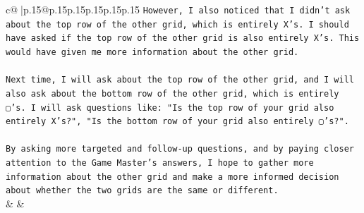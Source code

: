 \documentclass{article}
\begin{document}
{\begin{supertabular}{c@{$\;$}|p{.15\linewidth}@{}p{.15\linewidth}p{.15\linewidth}p{.15\linewidth}p{.15\linewidth}p{.15\linewidth}}
{{{\texttt{However, I also noticed that I didn't ask about the top row of the other grid, which is entirely X's. I should have asked if the top row of the other grid is also entirely X's. This would have given me more information about the other grid.} \\
\\ 
\texttt{Next time, I will ask about the top row of the other grid, and I will also ask about the bottom row of the other grid, which is entirely ▢'s. I will ask questions like: "Is the top row of your grid also entirely X's?", "Is the bottom row of your grid also entirely ▢'s?".} \\
\\ 
\texttt{By asking more targeted and follow{-}up questions, and by paying closer attention to the Game Master's answers, I hope to gather more information about the other grid and make a more informed decision about whether the two grids are the same or different.} \\
            }
        }
    }
    & & \\ \\


\end{supertabular}}
\end{document}
